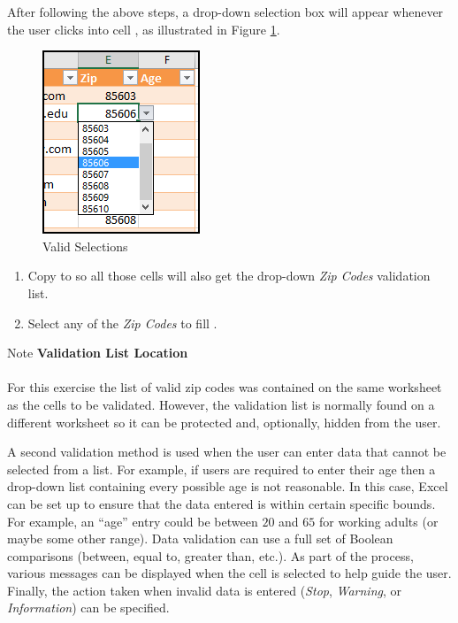 After following the above steps, a drop-down selection box will appear whenever the user clicks into cell , as illustrated in Figure \ref{07:fig38}. 

\begin{figure}[H]
	\centering
	\includegraphics[width=\maxwidth{.95\linewidth}]{gfx/ch07_fig38}
	\caption{Valid Selections}
	\label{07:fig38}
\end{figure}

\begin{enumbox}
	\begin{enumerate}
		\item Copy  to  so all those cells will also get the drop-down \textit{Zip Codes} validation list.
		\item Select any of the \textit{Zip Codes} to fill .
	\end{enumerate}
\end{enumbox}
	
\begin{center}
	\begin{infobox}{Note}
		\textbf{Validation List Location}
		\\
		\\
		For this exercise the list of valid zip codes was contained on the same worksheet as the cells to be validated. However, the validation list is normally found on a different worksheet so it can be protected and, optionally, hidden from the user.
	\end{infobox}
\end{center}

A second validation method is used when the user can enter data that cannot be selected from a list. For example, if users are required to enter their age then a drop-down list containing every possible age is not reasonable. In this case, Excel can be set up to ensure that the data entered is within certain specific bounds. For example, an ``age'' entry could be between $ 20 $ and $ 65 $ for working adults (or maybe some other range). Data validation can use a full set of Boolean comparisons (between, equal to, greater than, etc.). As part of the process, various messages can be displayed when the cell is selected to help guide the user. Finally, the action taken when invalid data is entered (\textit{Stop}, \textit{Warning}, or \textit{Information}) can be specified.

